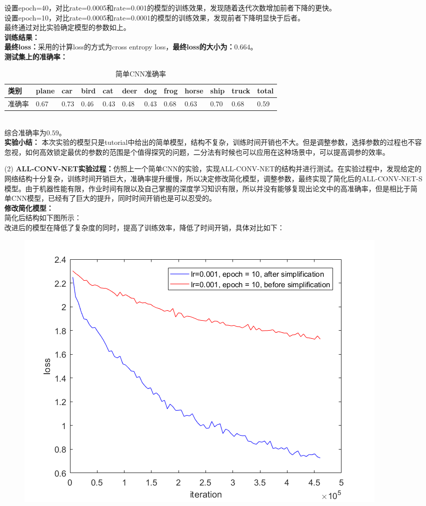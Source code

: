 \documentclass[a4paper,UTF8]{article}
\numberwithin{equation}{section}
\begin{document}
\begin{enumerate}
设置epoch=40，对比rate=0.0005和rate=0.001的模型的训练效果，发现随着迭代次数增加前者下降的更快。\\
设置epoch=10，对比rate=0.0005和rate=0.0001的模型的训练效果，发现前者下降明显快于后者。\\
最终通过对比实验确定模型的参数如上。\\
\textbf{训练结果：}\\
\textbf{最终loss：}采用的计算loss的方式为cross entropy loss，\textbf{最终loss的大小为：$0.664$}。\\
\textbf{测试集上的准确率：}
\begin{table}[h]
	\centering
	\caption{简单CNN准确率}
	\label{ac2}
	\begin{tabular}{|l|l|l|l|l|l|l|l|l|l|l|l|}
		\hline
	类别	& plane & car & bird & cat & deer & dog & frog & horse & ship & truck & total \\ \hline
	准确率	& 0.67 & 0.73 & 0.46 & 0.43 & 0.48 & 0.43 & 0.68 & 0.63 & 0.70 & 0.68 & 0.59 \\ \hline
	\end{tabular}
\end{table}\\
综合准确率为$0.59$。\\
\textbf{实验小结：}
本次实验的模型只是tutorial中给出的简单模型，结构不复杂，训练时间开销也不大。但是调整参数，选择参数的过程也不容忽视，如何高效锁定最优的参数的范围是个值得探究的问题，二分法有时候也可以应用在这种场景中，可以提高调参的效率。
\item [(2)]
\textbf{ALL-CONV-NET实验过程：}仿照上一个简单CNN的实验，实现ALL-CONV-NET的结构并进行测试。在实验过程中，发现给定的网络结构十分复杂，训练时间开销巨大，准确率提升缓慢，所以决定修改简化模型，调整参数，最终实现了简化后的ALL-CONV-NET-S模型。由于机器性能有限，作业时间有限以及自己掌握的深度学习知识有限，所以并没有能够复现出论文中的高准确率，但是相比于简单CNN模型，已经有了巨大的提升，同时时间开销也是可以忍受的。\\
\textbf{修改简化模型：}\\
简化后结构如下图所示：\\
改进后的模型在降低了复杂度的同时，提高了训练效率，降低了时间开销，具体对比如下：
\begin{figure}[!h]
	\centering   
	\includegraphics[scale=0.5]{after-before-simplification.png}  

\end{figure}
\end{enumerate}
\end{document}
